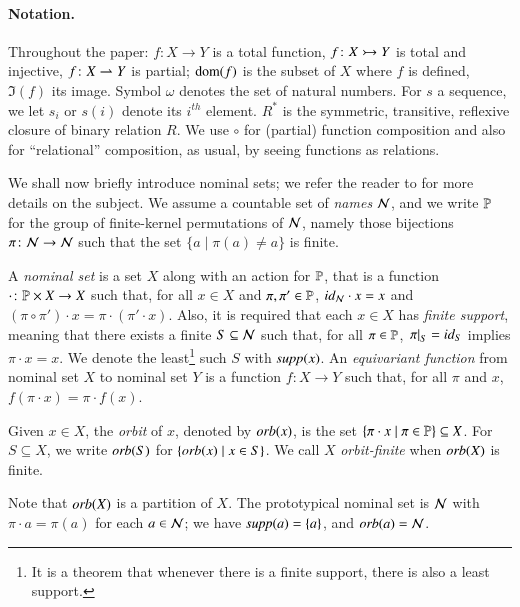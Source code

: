 \paragraph{Notation.} 
Throughout the paper: $f \colon X \to Y$ is a total function, $f \colon X \rightarrowtail Y$ is total and injective, $f \colon X \rightharpoonup Y$ is partial; $\operatorname{dom}(f)$ is the subset of $X$ where $f$ is defined, $\Im(f)$ its image. Symbol $\omega$ denotes the set of natural numbers. For $s$ a sequence, we let $s_i$ or $s(i)$ denote its $i^{\mathit{th}}$ element. $R^*$ is the symmetric, transitive, reflexive closure of binary relation $R$. We use $\circ$ for (partial) function composition and also for ``relational'' composition, as usual, by seeing functions as relations.

We shall now briefly introduce nominal sets; we refer the reader to \cite{GP02} for more details on the subject. We assume a countable set of \emph{names} $\mathcal{N}$, and we write $\mathbb{P}$ for the group of finite-kernel permutations of $\mathcal{N}$, namely those bijections $\pi \colon \mathcal{N} \to \mathcal{N}$ such that the set $\{ a \mid \pi(a) \neq a \}$ is finite.
\begin{definition}
A \emph{nominal set} is a set $X$ along with an action for $\mathbb{P}$, that is a function $\cdot \colon \mathbb{P} \times X \to X$ such that, for all $x \in X$ and $\pi,\pi' \in \mathbb{P}$, $id_{\mathcal{N}} \cdot x = x$ and $(\pi \circ \pi') \cdot x = \pi \cdot (\pi' \cdot x)$. Also, it is required that each $x \in X$ has \emph{finite support}, meaning that there exists a finite $S \subseteq \mathcal{N}$ such that, for all $\pi \in \mathbb{P}$, $\left.\pi\right|_{S} = id_S$ implies $\pi \cdot x = x$. We denote the least\footnote{It is a theorem that whenever there is a finite support, there is also a least support.} such $S$ with $\mathit{supp}(x)$. An \emph{equivariant function} from nominal set $X$ to nominal set $Y$ is a function $f : X \to Y$ such that, for all $\pi$ and $x$, $f(\pi \cdot x) = \pi \cdot f(x)$.
\end{definition}
%
\begin{definition}
Given $x \in X$, the \emph{orbit} of $x$, denoted by $\mathit{orb}(x) $, is the set $\{ \pi \cdot x \mid \pi \in \mathbb{P}\} \subseteq X$. For $S \subseteq X$, we write $\mathit{orb}(S)$ for $\{ \mathit{orb}(x) \mid x \in S\}$. We call $X$ \emph{orbit-finite} when $\mathit{orb}(X)$ is finite.
\end{definition}

\noindent Note that $\mathit{orb}(X)$ is a partition of $X$. The prototypical nominal set is $\mathcal{N}$ with $\pi \cdot a = \pi(a)$ for each $a \in \mathcal{N}$; we have $\mathit{supp}(a) = \{a\}$, and $\mathit{orb}(a) = \mathcal{N}$.
